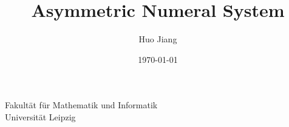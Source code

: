\title[ANS]{Asymmetric Numeral System}
\author{Huo Jiang}
\institute
{Fakult\"at f\"ur Mathematik und Informatik\\
Universit\"at Leipzig}
\date{\today}



